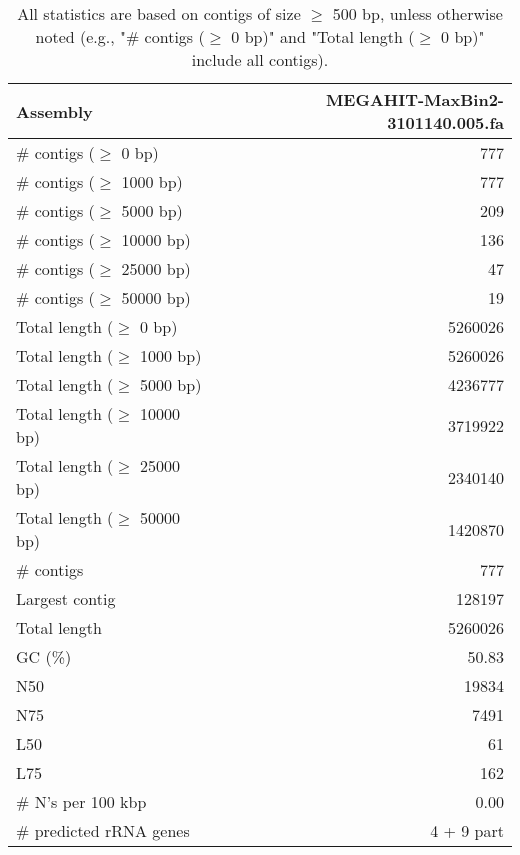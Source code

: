 \documentclass[12pt,a4paper]{article}
\begin{document}
\begin{table}[ht]
\begin{center}
\caption{All statistics are based on contigs of size $\geq$ 500 bp, unless otherwise noted (e.g., "\# contigs ($\geq$ 0 bp)" and "Total length ($\geq$ 0 bp)" include all contigs).}
\begin{tabular}{|l*{1}{|r}|}
\hline
Assembly & MEGAHIT-MaxBin2-3101140.005.fa \\ \hline
\# contigs ($\geq$ 0 bp) & 777 \\ \hline
\# contigs ($\geq$ 1000 bp) & 777 \\ \hline
\# contigs ($\geq$ 5000 bp) & 209 \\ \hline
\# contigs ($\geq$ 10000 bp) & 136 \\ \hline
\# contigs ($\geq$ 25000 bp) & 47 \\ \hline
\# contigs ($\geq$ 50000 bp) & 19 \\ \hline
Total length ($\geq$ 0 bp) & 5260026 \\ \hline
Total length ($\geq$ 1000 bp) & 5260026 \\ \hline
Total length ($\geq$ 5000 bp) & 4236777 \\ \hline
Total length ($\geq$ 10000 bp) & 3719922 \\ \hline
Total length ($\geq$ 25000 bp) & 2340140 \\ \hline
Total length ($\geq$ 50000 bp) & 1420870 \\ \hline
\# contigs & 777 \\ \hline
Largest contig & 128197 \\ \hline
Total length & 5260026 \\ \hline
GC (\%) & 50.83 \\ \hline
N50 & 19834 \\ \hline
N75 & 7491 \\ \hline
L50 & 61 \\ \hline
L75 & 162 \\ \hline
\# N's per 100 kbp & 0.00 \\ \hline
\# predicted rRNA genes & 4 + 9 part \\ \hline
\end{tabular}
\end{center}
\end{table}
\end{document}

